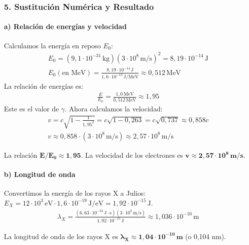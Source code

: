 \subsubsection*{5. Sustitución Numérica y Resultado}
\paragraph*{a) Relación de energías y velocidad}
Calculamos la energía en reposo $E_0$:
\begin{gather}
    E_0 = (9,1\cdot10^{-31}\,\text{kg})(3\cdot10^8\,\text{m/s})^2 = 8,19\cdot10^{-14}\,\text{J} \\
    E_0 (\text{en MeV}) = \frac{8,19\cdot10^{-14}\,\text{J}}{1,6\cdot10^{-13}\,\text{J/MeV}} \approx 0,512\,\text{MeV}
\end{gather}
La relación de energías es:
\begin{gather}
    \frac{E}{E_0} = \frac{1,0\,\text{MeV}}{0,512\,\text{MeV}} \approx 1,95
\end{gather}
Este es el valor de $\gamma$. Ahora calculamos la velocidad:
\begin{gather}
    v = c\sqrt{1 - \frac{1}{1,95^2}} = c\sqrt{1 - 0,263} = c\sqrt{0,737} \approx 0,858c \\
    v \approx 0,858 \cdot (3\cdot10^8\,\text{m/s}) \approx 2,57 \cdot 10^8\,\text{m/s}
\end{gather}
\begin{cajaresultado}
La relación $\boldsymbol{E/E_0 \approx 1,95}$. La velocidad de los electrones es $\boldsymbol{v \approx 2,57 \cdot 10^8\,\textbf{m/s}}$.
\end{cajaresultado}

\paragraph*{b) Longitud de onda}
Convertimos la energía de los rayos X a Julios: $E_X = 12\cdot10^3\,\text{eV} \cdot 1,6\cdot10^{-19}\,\text{J/eV} = 1,92\cdot10^{-15}\,\text{J}$.
\begin{gather}
    \lambda_X = \frac{(6,63\cdot10^{-34}\,\text{J}\cdot\text{s})(3\cdot10^8\,\text{m/s})}{1,92\cdot10^{-15}\,\text{J}} \approx 1,036\cdot10^{-10}\,\text{m}
\end{gather}
\begin{cajaresultado}
La longitud de onda de los rayos X es $\boldsymbol{\lambda_X \approx 1,04 \cdot 10^{-10}\,\textbf{m}}$ (o 0,104 nm).
\end{cajaresultado}

